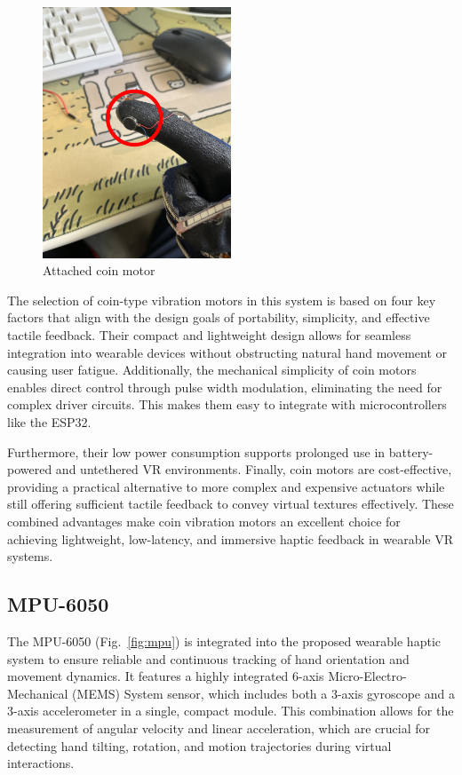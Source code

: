 \begin{figure}[H]\centering
	\includegraphics[width=0.5\textwidth]{Pictures/coin_motor_2.png}%
	\caption{Attached coin motor}\label{fig:coin_motor_2}%
\end{figure}

The selection of coin-type vibration motors in this system is based on four key factors that align with the design goals of portability, simplicity, and effective tactile feedback. Their compact and lightweight design allows for seamless integration into wearable devices without obstructing natural hand movement or causing user fatigue. Additionally, the mechanical simplicity of coin motors enables direct control through pulse width modulation, eliminating the need for complex driver circuits. This makes them easy to integrate with microcontrollers like the ESP32. 

Furthermore, their low power consumption supports prolonged use in battery-powered and untethered VR environments. Finally, coin motors are cost-effective, providing a practical alternative to more complex and expensive actuators while still offering sufficient tactile feedback to convey virtual textures effectively. These combined advantages make coin vibration motors an excellent choice for achieving lightweight, low-latency, and immersive haptic feedback in wearable VR systems.
\newpage
\subsection{MPU-6050}
The MPU-6050 (Fig.~\ref{fig:mpu}) is integrated into the proposed wearable haptic system to ensure reliable and continuous tracking of hand orientation and movement dynamics. It features a highly integrated 6-axis Micro-Electro-Mechanical  (MEMS) System sensor, which includes both a 3-axis gyroscope and a 3-axis accelerometer in a single, compact module. This combination allows for the measurement of angular velocity and linear acceleration, which are crucial for detecting hand tilting, rotation, and motion trajectories during virtual interactions\cite{mpu}.

